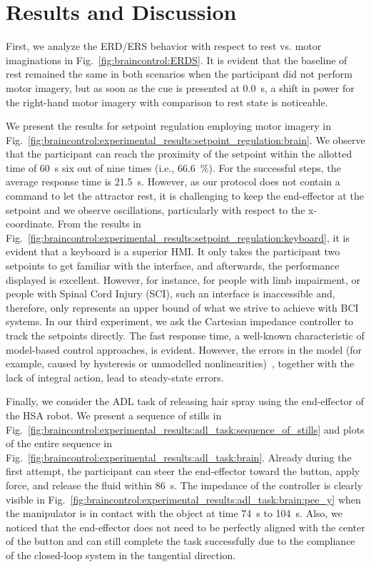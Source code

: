 \section{Results and Discussion}\label{sec:braincontrol:results_and_discussion}

First, we analyze the \gls{ERD}/\gls{ERS} behavior with respect to rest vs. motor imaginations in Fig.~\ref{fig:braincontrol:ERDS}. It is evident that the baseline of rest remained the same in both scenarios when the participant did not perform motor imagery, but as soon as the cue is presented at \SI{0.0}{s}, a shift in power for the right-hand motor imagery with comparison to rest state is noticeable. 

We present the results for setpoint regulation employing motor imagery in Fig.~\ref{fig:braincontrol:experimental_results:setpoint_regulation:brain}. 
We observe that the participant can reach the proximity of the setpoint within the allotted time of \SI{60}{s} six out of nine times (i.e., \SI{66.6}{\percent}).
For the successful steps, the average response time is \SI{21.5}{s}.
However, as our protocol does not contain a command to let the attractor rest, it is challenging to keep the end-effector at the setpoint and we observe oscillations, particularly with respect to the x-coordinate.
From the results in Fig.~\ref{fig:braincontrol:experimental_results:setpoint_regulation:keyboard}, it is evident that a keyboard is a superior \gls{HMI}. It only takes the participant two setpoints to get familiar with the interface, and afterwards, the performance displayed is excellent.
However, for instance, for people with limb impairment, or people with Spinal Cord Injury (SCI), such an interface is inaccessible and, therefore, only represents an upper bound of what we strive to achieve with \gls{BCI} systems.
In our third experiment, we ask the Cartesian impedance controller to track the setpoints directly.
The fast response time, a well-known characteristic of model-based control approaches, is evident. However, the errors in the model (for example, caused by hysteresis or unmodelled nonlinearities)~\cite{stolzle2024experimental}, together with the lack of integral action, lead to steady-state errors. %

Finally, we consider the \gls{ADL} task of releasing hair spray using the end-effector of the \gls{HSA} robot. We present a sequence of stills in Fig.~\ref{fig:braincontrol:experimental_results:adl_task:sequence_of_stills} and plots of the entire sequence in Fig.~\ref{fig:braincontrol:experimental_results:adl_task:brain}.
Already during the first attempt, the participant can steer the end-effector toward the button, apply force, and release the fluid within \SI{86}{s}.
The impedance of the controller is clearly visible in Fig.~\ref{fig:braincontrol:experimental_results:adl_task:brain:pee_y} when the manipulator is in contact with the object at time \SI{74}{s} to \SI{104}{s}.
Also, we noticed that the end-effector does not need to be perfectly aligned with the center of the button and can still complete the task successfully due to the compliance of the closed-loop system in the tangential direction.

